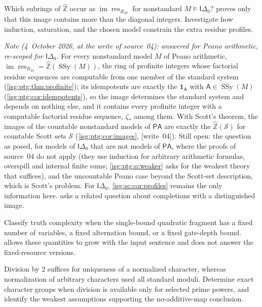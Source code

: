 \documentclass[11pt]{article}
\theoremstyle{definition}
\theoremstyle{remark}
\newcommand{\Z}{\mathbb{Z}}
\newcommand{\Zhat}{\widehat{\Z}}
\newcommand{\res}{\operatorname{res}}
\newcommand{\Idelta}{\mathsf{I}\Delta_0}
\newcommand{\im}{\operatorname{im}}
\newcommand{\PA}{\mathsf{PA}}
\newcommand{\SSy}{\operatorname{SSy}}
\begin{document}
\begin{question}\label{isg:sc:q:images}
Which subrings of $\Zhat$ occur as $\im\res_{R_M}$ for nonstandard
$M\models\Idelta$?  proves only that this image
contains more than the diagonal integers. Investigate how induction,
saturation, and the chosen model constrain the extra residue profiles.
\end{question}
\emph{Note (4~October 2026, at the write of source~04): answered for Peano
arithmetic, re-scoped for $\Idelta$.} For every nonstandard model $M$ of
Peano arithmetic, $\im\res_{R_M}=\Zhat(\SSy(M))$, the ring of profinite
integers whose factorial residue sequences are computable from one member
of the standard system (\cref{isg:ptg:thm:profinite}); its idempotents are
exactly the $\mathbf 1_{\mathsf A}$ with $\mathsf A\in\SSy(M)$
(\cref{isg:ptg:cor:idempotents}), so the image determines the standard
system and depends on nothing else, and it contains every profinite integer
with a computable factorial residue sequence, $\zeta_*$ among them. With
Scott's theorem, the images of the countable nonstandard models of $\PA$
are exactly the $\Zhat(\mathcal S)$ for countable Scott sets $\mathcal S$
(\cref{isg:ptg:cor:images}, \textup{[write~04]}). Still open: the question
as posed, for models of $\Idelta$ that are not models of $\PA$, where the
proofs of source~04 do not apply (they use induction for arbitrary
arithmetic formulas, overspill and internal finite sums;
\cref{isg:ptg:q:weaker} asks for the weakest theory that suffices), and
the uncountable Peano case beyond the Scott-set description, which is
Scott's problem. For $\Idelta$, \cref{isg:sc:cor:profiles} remains the only
information here.  asks a related question
about completions with a distinguished image.

\begin{question}\label{isg:sc:q:resources}
Classify truth complexity when the single-bound quadratic fragment has a
fixed number of variables, a fixed alternation bound, or a fixed
gate-depth bound.  allows these quantities to
grow with the input sentence and does not answer the fixed-resource
versions.
\end{question}

\begin{question}\label{isg:sc:q:division}
Division by $2$ suffices for uniqueness of a normalized character, whereas
normalization of arbitrary characters used all standard moduli. Determine
exact character groups when division is available only for selected prime
powers, and identify the weakest assumptions supporting the no-additive-map
conclusion.
\end{question}
\end{document}
